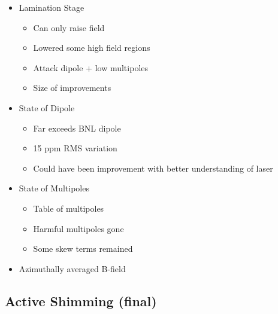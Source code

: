 \begin{itemize}
  \item Lamination Stage
    \begin{itemize}
        \item Can only raise field
        \item Lowered some high field regions
        \item Attack dipole + low multipoles
        \item Size of improvements
    \end{itemize}
  \item State of Dipole
    \begin{itemize}
      \item Far exceeds BNL dipole
      \item 15 ppm RMS variation
      \item Could have been improvement with better understanding of laser
    \end{itemize}
  \item State of Multipoles
    \begin{itemize}
      \item Table of multipoles
      \item Harmful multipoles gone
      \item Some skew terms remained
    \end{itemize}
  \item Azimuthally averaged B-field
\end{itemize}

\subsection{Active Shimming (final)}
